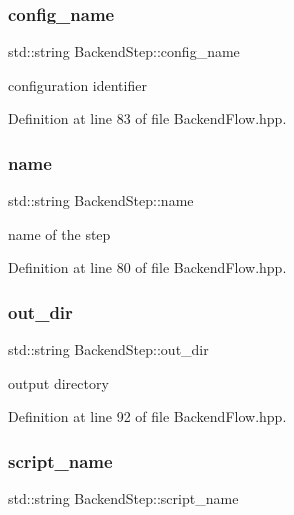 \subsubsection{\texorpdfstring{config\+\_\+name}{config\_name}}
{\footnotesize\ttfamily std\+::string Backend\+Step\+::config\+\_\+name}



configuration identifier 



Definition at line 83 of file Backend\+Flow.\+hpp.

\mbox{\label{structBackendStep_aebef81b05bdd51f7d4061a8a30e87371}} 
\subsubsection{\texorpdfstring{name}{name}}
{\footnotesize\ttfamily std\+::string Backend\+Step\+::name}



name of the step 



Definition at line 80 of file Backend\+Flow.\+hpp.

\mbox{\label{structBackendStep_aacd4173a11c0ec3a5f70fbf00a6ff1e3}} 
\subsubsection{\texorpdfstring{out\+\_\+dir}{out\_dir}}
{\footnotesize\ttfamily std\+::string Backend\+Step\+::out\+\_\+dir}



output directory 



Definition at line 92 of file Backend\+Flow.\+hpp.

\mbox{\label{structBackendStep_a0cb02c4523f370cd78cf5873a53278d5}} 
\subsubsection{\texorpdfstring{script\+\_\+name}{script\_name}}
{\footnotesize\ttfamily std\+::string Backend\+Step\+::script\+\_\+name}



